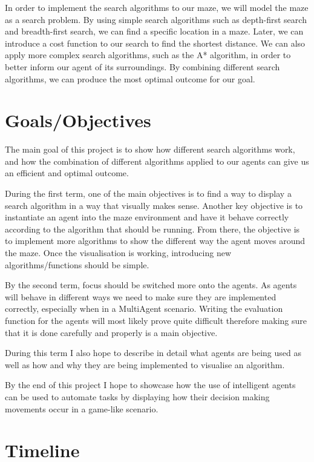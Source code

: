 \documentclass{article}
\begin{document}
In order to implement the search algorithms to our maze, we will model the maze as a search problem.  By using simple search algorithms such as depth-first search and breadth-first search, we can find a specific location in a maze. Later, we can introduce a cost function to our search to find the shortest distance. We can also apply more complex search algorithms, such as the A* algorithm, in order to better inform our agent  of its surroundings. By combining different search algorithms, we can produce the most optimal outcome for our goal.

\section{Goals/Objectives}

The main goal of this project is to show how different search algorithms work, and how the combination of different algorithms applied to our agents can give us an efficient and optimal outcome.

During the first term, one of the main objectives is to find a way to display a search algorithm in a way that visually makes sense. Another key objective is to instantiate an agent into the maze environment and have it behave correctly according to the algorithm that should be running. From there, the objective is to implement more algorithms to show the different way the agent moves around the maze. Once the visualisation is working, introducing new algorithms/functions should be simple.

By the second term, focus should be switched more onto the agents. As agents will behave in different ways we need to make sure they are implemented correctly, especially when in a MultiAgent scenario. Writing the evaluation function for the agents will most likely prove quite difficult therefore making sure that it is done carefully and properly is a main objective.

During this term I also hope to describe in detail what agents are being used as well as how and why they are being implemented to visualise an algorithm. 

By the end of this project I hope to showcase how the use of intelligent agents can be used to automate tasks by displaying how their decision making movements occur in a game-like scenario. 

\newpage
\section{Timeline}
\end{document}
